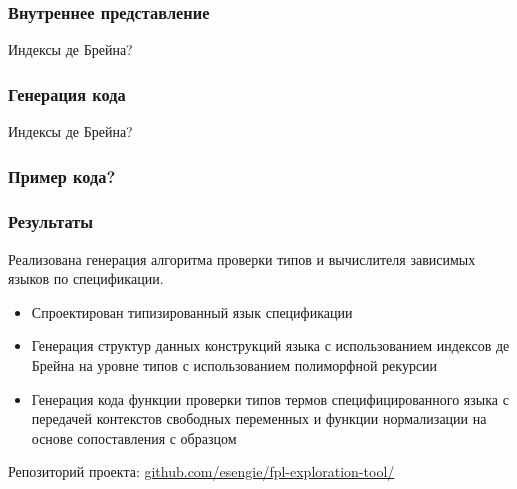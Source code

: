 \begin{frame}
\frametitle{Внутреннее представление}
Индексы де Брейна?
\end{frame}
\begin{frame}
\frametitle{Генерация кода}
Индексы де Брейна?
\end{frame}
\begin{frame}[fragile]
\frametitle{Пример кода?}

\end{frame}

\begin{frame}
\frametitle{Результаты}
Реализована генерация алгоритма проверки типов и вычислителя зависимых языков по спецификации.

\begin{itemize}
\item Спроектирован типизированный язык спецификации
\item Генерация структур данных конструкций языка с использованием индексов де Брейна на уровне типов с использованием полиморфной рекурсии
\item Генерация кода функции проверки типов термов специфицированного языка с передачей контекстов свободных переменных и функции нормализации на основе сопоставления с образцом
\end{itemize}

Репозиторий проекта: \url{github.com/esengie/fpl-exploration-tool/}
\end{frame}
